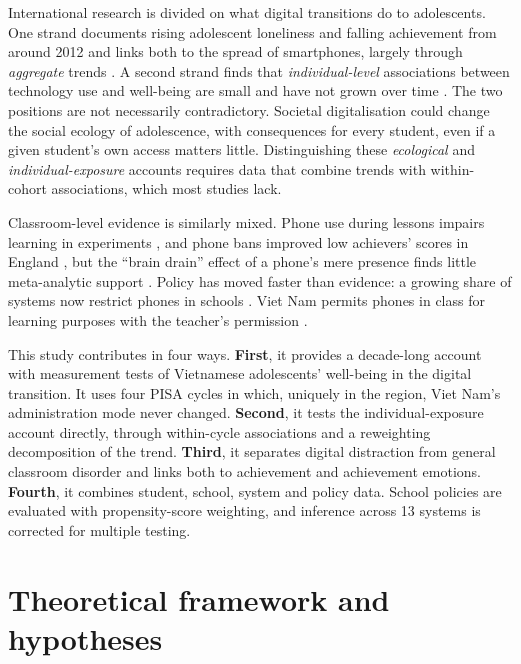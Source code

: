 \documentclass[preprint,12pt,authoryear,nonatbib]{elsarticle}
\let\citep\parencite
\begin{document}
International research is divided on what digital transitions do to adolescents. One strand documents rising adolescent loneliness and falling achievement from around 2012 and links both to the spread of smartphones, largely through \emph{aggregate} trends \citep{twenge2021,twenge2025}. A second strand finds that \emph{individual-level} associations between technology use and well-being are small \citep{orben2019,przybylski2017} and have not grown over time \citep{vuorre2021}. The two positions are not necessarily contradictory. Societal digitalisation could change the social ecology of adolescence, with consequences for every student, even if a given student's own access matters little. Distinguishing these \emph{ecological} and \emph{individual-exposure} accounts requires data that combine trends with within-cohort associations, which most studies lack.

Classroom-level evidence is similarly mixed. Phone use during lessons impairs learning in experiments \citep{kuznekoff2013,mendoza2018}, and phone bans improved low achievers' scores in England \citep{beland2016}, but the ``brain drain'' effect of a phone's mere presence finds little meta-analytic support \citep{ward2017,bottger2023}. Policy has moved faster than evidence: a growing share of systems now restrict phones in schools \citep{unesco2023gem}. Viet Nam permits phones in class for learning purposes with the teacher's permission \citep{moet2020circular32}.

This study contributes in four ways. \textbf{First}, it provides a decade-long account with measurement tests of Vietnamese adolescents' well-being in the digital transition. It uses four PISA cycles in which, uniquely in the region, Viet Nam's administration mode never changed. \textbf{Second}, it tests the individual-exposure account directly, through within-cycle associations and a reweighting decomposition of the trend. \textbf{Third}, it separates digital distraction from general classroom disorder and links both to achievement and achievement emotions. \textbf{Fourth}, it combines student, school, system and policy data. School policies are evaluated with propensity-score weighting, and inference across 13 systems is corrected for multiple testing.

\section{Theoretical framework and hypotheses}
\end{document}
